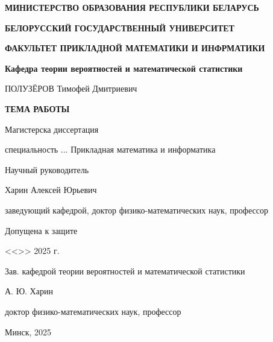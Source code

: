 \begin{titlepage}
    \begin{center}
       \textbf{МИНИСТЕРСТВО ОБРАЗОВАНИЯ РЕСПУБЛИКИ БЕЛАРУСЬ}

       \textbf{БЕЛОРУССКИЙ ГОСУДАРСТВЕННЫЙ УНИВЕРСИТЕТ}

       \textbf{ФАКУЛЬТЕТ ПРИКЛАДНОЙ МАТЕМАТИКИ И ИНФРМАТИКИ}

       \textbf{Кафедра теории вероятностей и математической статистики}
    \end{center}

    \vspace{15pt}

    \begin{center}
        ПОЛУЗЁРОВ Тимофей Дмитриевич
    \end{center}

    \begin{center}
        \textbf{ТЕМА РАБОТЫ}
    \end{center}

    \begin{center}
        Магистерска диссертация

        специальность ... 
        Прикладная математика и информатика
    \end{center}

    \vspace{10pt}

    \hfill
    \begin{minipage}{0.5\linewidth}
        \begin{flushleft}
            Научный руководитель
    
            Харин Алексей Юрьевич
    
            заведующий кафедрой, доктор физико-математических наук, профессор
    
        \end{flushleft}
    \end{minipage}

    \vspace{30pt}

    Допущена к защите

    <<\underline{\hspace{20pt}}>> \underline{\hspace{100pt}} 2025 г.

    Зав. кафедрой теории вероятностей и математической статистики

    \underline{\hspace{80pt}} А. Ю. Харин

    доктор физико-математических наук, профессор    

    \vspace{20pt}

    \begin{center}
        Минск, 2025
    \end{center}
\end{titlepage}
\setcounter{page}{2}